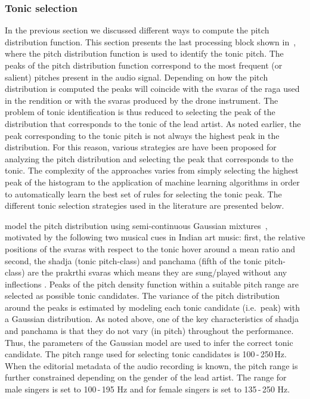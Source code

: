 {\subsubsection{Tonic selection}
\label{Tonic Selection}

In the previous section we discussed different ways to compute the pitch distribution function. This section presents the last processing block shown in~, where the pitch distribution function is used to identify the tonic pitch. The peaks of the pitch distribution function correspond to the most frequent (or salient) pitches present in the audio signal. Depending on how the pitch distribution is computed the peaks will coincide with the \glspl{svara} of the \gls{raga} used in the rendition or with the \glspl{svara} produced by the drone instrument. The problem of tonic identification is thus reduced to selecting the peak of the distribution that corresponds to the tonic of the lead artist. As noted earlier, the peak corresponding to the tonic pitch is not always the highest peak in the distribution. For this reason, various strategies are have been proposed for analyzing the pitch distribution and selecting the peak that corresponds to the tonic. The complexity of the approaches varies from simply selecting the highest peak of the histogram to the application of machine learning algorithms in order to automatically learn the best set of rules for selecting the tonic peak. The different tonic selection strategies used in the literature are presented below.

\cite{Ranjani2011} model the pitch distribution using semi-continuous Gaussian mixtures~\cite{Huang2001}, motivated by the following two musical cues in Indian art music: first, the relative positions of the \glspl{svara} with respect to the tonic hover around a mean ratio \cite{Krishnaswamy2003} and second, the \gls{shadja} (tonic pitch-class) and panchama (fifth of the tonic pitch-class) are the prakrthi \glspl{svara} which means they are sung/played without any inflections \cite{Manikandan2004,Krishnaswamyicassp2003}. Peaks of the pitch density function within a suitable pitch range are selected as possible tonic candidates. The variance of the pitch distribution around the peaks is estimated by modeling each tonic candidate (i.e.~peak) with a Gaussian distribution. As noted above, one of the key characteristics of \gls{shadja} and panchama is that they do not vary (in pitch) throughout the performance. Thus, the parameters of the Gaussian model are used to infer the correct tonic candidate. The pitch range used for selecting tonic candidates is 100\,-\,250\,Hz. When the editorial metadata of the audio recording is known, the pitch range is further constrained depending on the gender of the lead artist. The range for male singers is set to 100\,-\,195 Hz and for female singers is set to 135\,-\,250 Hz.

}
